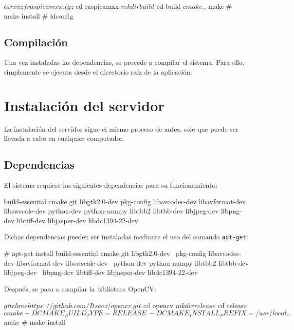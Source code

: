 \begin{listing}[%
  style    = consola]
$ tar xvzf raspicamxx.tgz
$ cd raspicamxx
$ mkdir build
$ cd build
$ cmake ..
$ make
# make install
# ldconfig
\end{listing}

\subsection{Compilación}

Una vez instaladas las dependencias, se procede a compilar el sistema. Para ello, simplemente se
ejecuta desde el directorio raíz de la aplicación:


\section{Instalación del servidor}

La instalación del servidor sigue el mismo proceso de antes, solo que puede ser llevada a cabo en
cualquier computador.

\subsection{Dependencias}

El sistema requiere las siguientes dependencias para su funcionamiento:
\begin{listing}[%
  style=consola]
build-essential
cmake
git
libgtk2.0-dev
pkg-config
libavcodec-dev
libavformat-dev
libswscale-dev
python-dev
python-numpy
libtbb2
libtbb-dev
libjpeg-dev
libpng-dev
libtiff-dev
libjasper-dev
libdc1394-22-dev
\end{listing}

Dichas dependencias pueden ser instaladas mediante el uso del comando \texttt{apt-get}:

\begin{listing}[%
  style=consola]
# apt-get install build-essential cmake git libgtk2.0-dev \
    pkg-config libavcodec-dev libavformat-dev libswscale-dev \
    python-dev python-numpy libtbb2 libtbb-dev libjpeg-dev \
    libpng-dev libtiff-dev libjasper-dev libdc1394-22-dev
\end{listing}

Después, se pasa a compilar la biblioteca OpenCV:

\begin{listing}[%
  style=consola]
$ git clone https://github.com/Itseez/opencv.git
$ cd opencv
$ mkdir release
$ cd release
$ cmake -D CMAKE_BUILD_TYPE=RELEASE \
  -D CMAKE_INSTALL_PREFIX=/usr/local ..
$ make
# make install
\end{listing}

